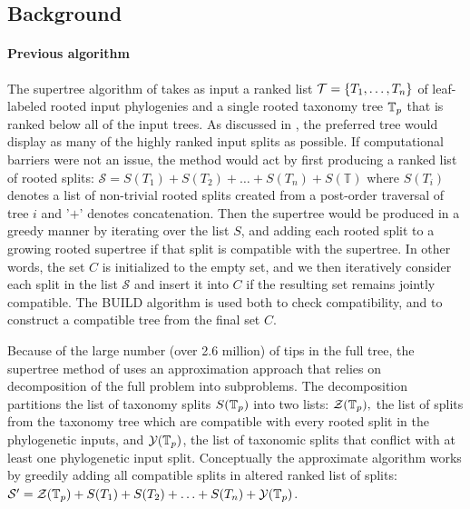 \documentclass[english]{article}
\begin{document}
\subsection{Background}

\paragraph{Previous algorithm}

The supertree algorithm of \citet{redelings2017supertree} takes as
input a ranked list $\mathcal{T}=\left\{ T_{1},\ldots,T_{n}\right\} $
of leaf-labeled rooted input phylogenies and a single rooted taxonomy
tree $\mbox{\ensuremath{\mathbb{T}}}_{p}$ that is ranked below all of the input trees.
As
discussed in \citet{redelings2017supertree}, the preferred tree would
display as many of the highly ranked input splits as possible.
If
computational barriers were not an issue, the method would act by
first producing a ranked list of rooted splits:
$\mathcal{S}=S(T_{1})+S(T_{2})+\ldots+S(T_{n})+S(\mathbb{T})$ where
$S(T_{i})$ denotes a list of non-trivial rooted splits created from a
post-order traversal of tree $i$ and '$+$' denotes concatenation.
Then
the supertree would be produced in a greedy manner by iterating over
the list $S$, and adding each rooted split to a growing rooted
supertree if that split is compatible with the supertree.
In other
words, the set $C$ is initialized to the empty set, and we then
iteratively consider each split in the list $\mathcal{S}$ and insert
it into $C$ if the resulting set remains jointly compatible.
The BUILD
algorithm \citep{AhoSSU1981} is used both to check compatibility, and
to construct a compatible tree from the final set $C$.

Because of the large number (over 2.6 million) of tips in the full
tree, the supertree method of \citet{redelings2017supertree} uses an
approximation approach that relies on decomposition of the full
problem into subproblems.
The decomposition partitions the list of
taxonomy splits $S(\mbox{\ensuremath{\mathbb{T}}}_{p})$ into two lists:
$\mathcal{Z}(\mbox{\ensuremath{\mathbb{T}}}_{p}),$ the list of splits from the taxonomy tree
which are compatible with every rooted split in the phylogenetic
inputs, and $\mathcal{Y}(\mbox{\ensuremath{\mathbb{T}}}_{p})$, the list of taxonomic splits
that conflict with at least one phylogenetic input split.
Conceptually
the approximate algorithm works by greedily adding all compatible
splits in altered ranked list of splits:
$\mathcal{S}^{\prime}=\mathcal{Z}(\mbox{\ensuremath{\mathbb{T}}}_{p})+S(T_{1})+S(T_{2})+\ldots+S(T_{n})+\mathcal{Y}(\mbox{\ensuremath{\mathbb{T}}}_{p})$.
\end{document}
